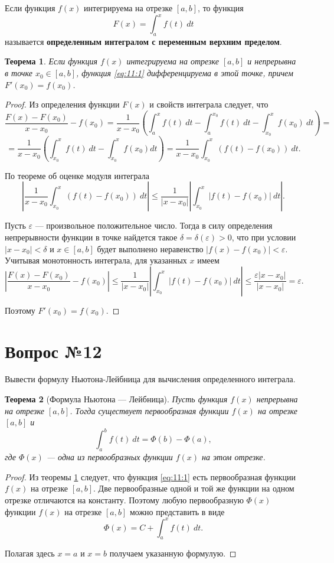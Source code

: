 \documentclass[12pt]{article}
\numberwithin{equation}{section}
\newtheorem{theorem}{Теорема}[section]
\begin{document}
Если функция $f(x)$ интегрируема на отрезке $[a,b]$, то функция
\begin{equation} \label{eq:11:1} 
F(x) = \int_a^x f(t)~dt
\end{equation}
называется \textbf{определенным интегралом с переменным верхним пределом}.
\begin{theorem}  \label{th:11:1}
 Если функция $f(x)$ интегрируема на отрезке $[a, b]$ и непрерывна в точке $x_0 \in [a,b]$, функция \ref{eq:11:1} дифференцируема в этой точке, причем $F'(x_0) = f(x_0)$.
\end{theorem}
\begin{proof}Из  определения функции $F(x)$ и свойств интеграла следует, что
\[ \frac{F(x)- F(x_0)}{x - x_0} - f(x_0) = \frac{1}{x - x_0} \left( \int_a^x f(t) ~dt - \int_a^{x_0} f(t) ~dt - \int_{x_0}^x f(x_0)~dt \right) =\]
\[ = \frac{1}{x-x_0} \left( \int_{x_0}^x f(t)~dt - \int_{x_0}^x f(x_0) dt \right) = \frac{1}{x-x_0} \int_{x_0}^x (f(t) - f(x_0))~dt.\]

По теореме об оценке модуля интеграла
\[ \left| \frac{1}{x-x_0} \int_{x_0}^x (f(t) - f(x_0))~dt \right| \leqslant \frac{1}{|x-x_0|} \left| \int_{x_0}^x |f(t) - f(x_0)| ~dt \right|.\]

Пусть $\varepsilon$ ---  произвольное положительное число. Тогда в силу определения непрерывности функции в точке найдется такое $\delta = \delta(\varepsilon) > 0$, что при условии $|x - x_0| < \delta$ и $x \in [a,b]$ будет выполнено неравенство $|f(x) - f(x_0)| < \varepsilon$. Учитывая монотонность интеграла, для указанных $x$ имеем
\[ \left| \frac{F(x) - F(x_0)}{x - x_0} - f(x_0) \right| \leqslant \frac{1}{|x - x_0|} \left| \int_{x_0}^x |f(t) - f(x_0)| ~dt\right| \leqslant \frac{\varepsilon|x-x_0|}{|x-x_0|} = \varepsilon.\]

Поэтому $F'(x_0) = f(x_0)$.
\end{proof}

\section{Вопрос №12} %
\begin{framed}
Вывести формулу Ньютона-Лейбница для вычисления определенного интеграла.
\end{framed}
\begin{theorem} [Формула Ньютона --- Лейбница]\label{th:12:1}
Пусть функция $f(x)$ непрерывна на отрезке $[a,b]$. Тогда существует первообразная функции $f(x)$ на отрезке $[a,b]$ и
\[ \int_a^b f(t)~dt = \Phi(b) - \Phi(a), \]
где $\Phi(x)$ --- одна из первообразных функции $f(x)$ на этом отрезке.
\end{theorem}
\begin{proof}
Из теоремы \ref{th:11:1} следует, что функция \ref{eq:11:1} есть первообразная функции $f(x)$ на отрезке $[a,b]$. Две первообразные одной и той же функции на одном отрезке отличаются на константу. Поэтому любую первообразную $\Phi(x)$ функции $f(x)$ на отрезке $[a,b]$ можно представить в виде
\[ \Phi(x) = C + \int_a^x f(t)~dt. \]

Полагая здесь $x = a$ и $x = b$ получаем указанную формулую.
\end{proof}
\end{document}
